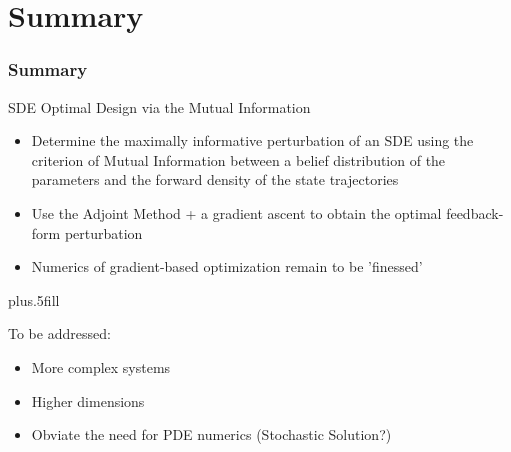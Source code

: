 \documentclass{beamer}
\begin{document}
\section*{Summary}

\begin{frame}
\frametitle<presentation>{Summary}
\begin{block}{SDE Optimal Design via the Mutual Information}
  \begin{itemize}
    \item Determine the maximally informative perturbation of an SDE using the
    criterion of Mutual Information between a belief distribution of the
    parameters and the forward density of the state trajectories
    \pause
    \item Use the Adjoint Method + a gradient ascent to
    obtain the optimal feedback-form perturbation  \pause
	\item Numerics of gradient-based optimization remain to
	be 'finessed'
  \end{itemize}
\end{block}

\vskip0pt plus.5fill
 \pause
\begin{block}{To be addressed:}
   \begin{itemize}
     \item More complex systems
     \item Higher dimensions 
     \item Obviate the need for PDE numerics (Stochastic Solution?)
   \end{itemize}
 \end{block}

\end{frame}
\end{document}
